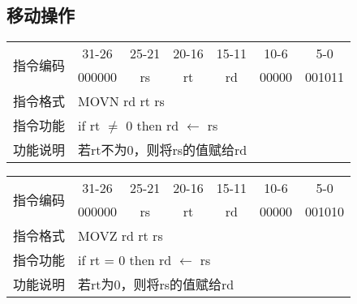 \subsection{移动操作}
	\begin{table}[!hbp]
		\centering
		\begin{tabular}{|c|c|c|c|c|c|c|}
		\hline
		\multirow{2}{*}{指令编码} & 31-26&25-21 & 20-16&15-11 &10-6 &5-0\\
		\cline{2-7} & 000000 & rs & rt & rd & 00000& 001011 \\
		\hline
		指令格式&\multicolumn{6}{|l|}{MOVN rd rt rs}\\
		\hline		
		指令功能&\multicolumn{6}{|l|}{if rt $\neq$ 0 then rd $\leftarrow$ rs}\\
		\hline		
		功能说明&\multicolumn{6}{|l|}{若rt不为0，则将rs的值赋给rd}\\
		\hline
		\end{tabular}
	\end{table}
	\begin{table}[!hbp]
		\centering
		\begin{tabular}{|c|c|c|c|c|c|c|}
		\hline
		\multirow{2}{*}{指令编码} & 31-26&25-21 & 20-16&15-11 &10-6 &5-0\\
		\cline{2-7} & 000000 & rs & rt & rd & 00000& 001010 \\
		\hline
		指令格式&\multicolumn{6}{|l|}{MOVZ rd rt rs}\\
		\hline		
		指令功能&\multicolumn{6}{|l|}{if rt = 0 then rd $\leftarrow$ rs}\\
		\hline		
		功能说明&\multicolumn{6}{|l|}{若rt为0，则将rs的值赋给rd}\\
		\hline
		\end{tabular}
	\end{table}
\newpage

